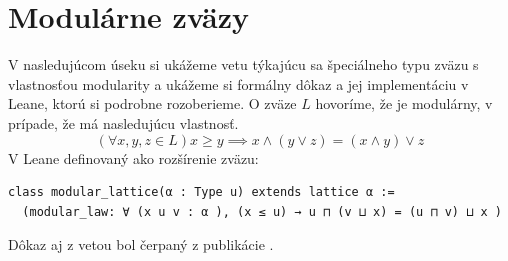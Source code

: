 \documentclass[a4paper,10pt,oneside]{report}%
\begin{document}
\section{Modulárne zväzy}

    V nasledujúcom úseku si ukážeme vetu týkajúcu sa špeciálneho typu zväzu s vlastnosťou
modularity a ukážeme si formálny dôkaz a jej implementáciu v Leane, ktorú si
podrobne rozoberieme.
    O zväze $L$ hovoríme, že je modulárny, v prípade, že má nasledujúcu vlastnosť.
\begin{equation*}
    (\forall x,y,z \in L) x \geq y \implies x \wedge ( y \vee z) = (x \wedge y) \vee z
\end{equation*}
    V Leane definovaný ako rozšírenie zväzu:

\begin{lstlisting}
class modular_lattice(α : Type u) extends lattice α :=
  (modular_law: ∀ (x u v : α ), (x ≤ u) → u ⊓ (v ⊔ x) = (u ⊓ v) ⊔ x )
\end{lstlisting}

    Dôkaz aj z vetou bol čerpaný z publikácie \cite{gratzer}.
\end{document}
